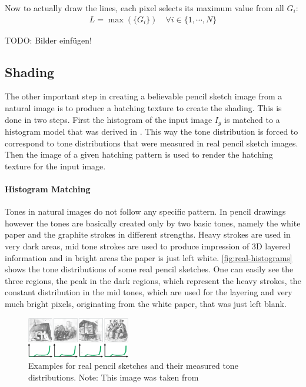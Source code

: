Now to actually draw the lines, each pixel selects its maximum value from all
$G_i$:
\begin{align*}
 L = \max(\lbrace G_i\rbrace) \quad \forall i \in  \lbrace1,\cdots,N\rbrace
\end{align*}

TODO: Bilder einfügen!

\subsection{Shading}
The other important step in creating a believable pencil sketch image from a
natural image is to produce a hatching texture to create the shading. This is
done in two steps. First the histogram of the input image $I_g$ is matched to a
histogram model that was derived in \cite{mainPaper}. This way the tone
distribution is forced to correspond to tone distributions that were measured in
real pencil sketch images. Then the image of a given hatching pattern is used to
render the hatching texture for the input image. 

\paragraph{Histogram Matching}
Tones in natural images do not follow any specific pattern. In pencil drawings
however the tones are basically created only by two basic tones, namely the
white paper and the graphite strokes in different strengths. Heavy strokes are
used in very dark areas, mid tone strokes are used to produce impression of 3D
layered information and in bright areas the paper is just left white.
\autoref{fig:real-histograms} shows the tone distributions of some real pencil
sketches. One can easily see the three regions, the peak in the dark regions,
which represent the heavy strokes, the constant distribution in the mid tones,
which are used for the layering and very much bright pixels, originating from
the white paper, that was just left blank.

\begin{figure}[htb]
  \centering
  \includegraphics[width=0.4\textwidth]{images/real-histograms.png}
  \caption{Examples for real pencil sketches and their measured tone
    distributions. Note: This image was taken from \cite{mainPaper}}
  \label{fig:real-histograms}
\end{figure}


